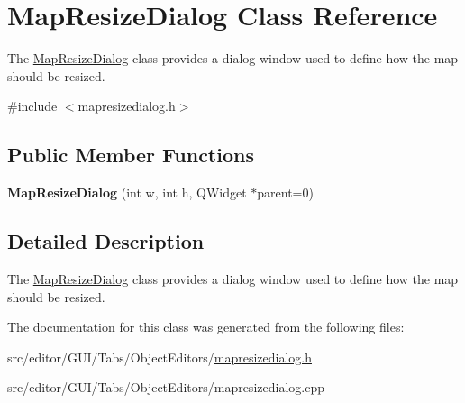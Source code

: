 \hypertarget{class_map_resize_dialog}{\section{\-Map\-Resize\-Dialog \-Class \-Reference}
\label{class_map_resize_dialog}
}


\-The \hyperlink{class_map_resize_dialog}{\-Map\-Resize\-Dialog} class provides a dialog window used to define how the map should be resized.  




{\ttfamily \#include $<$mapresizedialog.\-h$>$}

\subsection*{\-Public \-Member \-Functions}
\begin{DoxyCompactItemize}
\item 
\hypertarget{class_map_resize_dialog_a94fbe6945fc72c26fa0df04b5056e80c}{{\bfseries \-Map\-Resize\-Dialog} (int w, int h, \-Q\-Widget $\ast$parent=0)}\label{class_map_resize_dialog_a94fbe6945fc72c26fa0df04b5056e80c}

\end{DoxyCompactItemize}


\subsection{\-Detailed \-Description}
\-The \hyperlink{class_map_resize_dialog}{\-Map\-Resize\-Dialog} class provides a dialog window used to define how the map should be resized. 

\-The documentation for this class was generated from the following files\-:\begin{DoxyCompactItemize}
\item 
src/editor/\-G\-U\-I/\-Tabs/\-Object\-Editors/\hyperlink{mapresizedialog_8h}{mapresizedialog.\-h}\item 
src/editor/\-G\-U\-I/\-Tabs/\-Object\-Editors/mapresizedialog.\-cpp\end{DoxyCompactItemize}
